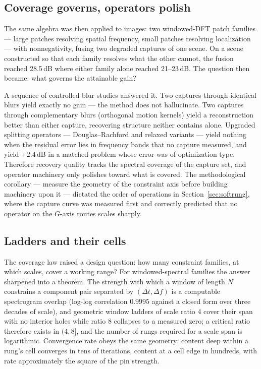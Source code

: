 \documentclass[11pt]{article}
\theoremstyle{definition}
\begin{document}
\subsection{Coverage governs, operators polish}

The same algebra was then applied to images: two windowed-DFT patch
families --- large patches resolving spatial frequency, small patches
resolving localization --- with nonnegativity, fusing two degraded captures
of one scene. On a scene constructed so that each family resolves what the
other cannot, the fusion reached 28.5\,dB where either family alone reached
21--23\,dB. The question then became: what governs the attainable gain?

A sequence of controlled-blur studies answered it. Two captures through
identical blurs yield exactly no gain --- the method does not hallucinate.
Two captures through complementary blurs (orthogonal motion kernels) yield
a reconstruction better than either capture, recovering structure neither
contains alone. Upgraded splitting operators --- Douglas--Rachford and
relaxed variants --- yield nothing when the residual error lies in
frequency bands that no capture measured, and yield $+2.4$\,dB in a
matched problem whose error was of optimization type. Therefore recovery
quality tracks the spectral coverage of the capture set, and operator
machinery only polishes toward what is covered. The methodological
corollary --- measure the geometry of the constraint axis before building
machinery upon it --- dictated the order of operations in
Section~\ref{sec:softrung}, where the capture curve was measured first and
correctly predicted that no operator on the $G$-axis routes scales sharply.

\subsection{Ladders and their cells}

The coverage law raised a design question: how many constraint families,
at which scales, cover a working range? For windowed-spectral families the
answer sharpened into a theorem. The strength with which a window of length
$N$ constrains a component pair separated by $(\Delta t,\Delta f)$ is a
computable spectrogram overlap (log-log correlation $0.9995$ against a
closed form over three decades of scale), and geometric window ladders of
scale ratio 4 cover their span with no interior holes while ratio 8
collapses to a measured zero; a critical ratio therefore exists in $(4,8]$,
and the number of rungs required for a scale span is logarithmic.
Convergence rate obeys the same geometry: content deep within a rung's cell
converges in tens of iterations, content at a cell edge in hundreds, with
rate approximately the square of the pin strength.
\end{document}
